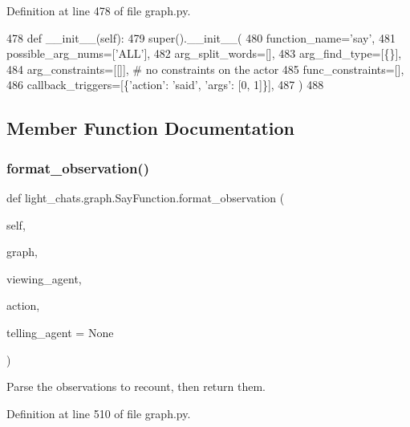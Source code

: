 Definition at line 478 of file graph.\+py.


\begin{DoxyCode}
478     \textcolor{keyword}{def }\_\_init\_\_(self):
479         super().\_\_init\_\_(
480             function\_name=\textcolor{stringliteral}{'say'},
481             possible\_arg\_nums=[\textcolor{stringliteral}{'ALL'}],
482             arg\_split\_words=[],
483             arg\_find\_type=[\{\}],
484             arg\_constraints=[[]],  \textcolor{comment}{# no constraints on the actor}
485             func\_constraints=[],
486             callback\_triggers=[\{\textcolor{stringliteral}{'action'}: \textcolor{stringliteral}{'said'}, \textcolor{stringliteral}{'args'}: [0, 1]\}],
487         )
488 
\end{DoxyCode}


\subsection{Member Function Documentation}
\mbox{\label{classlight__chats_1_1graph_1_1SayFunction_a20e5908183144f719a93276707938894}} 
\subsubsection{\texorpdfstring{format\+\_\+observation()}{format\_observation()}}
{\footnotesize\ttfamily def light\+\_\+chats.\+graph.\+Say\+Function.\+format\+\_\+observation (\begin{DoxyParamCaption}\item[{}]{self,  }\item[{}]{graph,  }\item[{}]{viewing\+\_\+agent,  }\item[{}]{action,  }\item[{}]{telling\+\_\+agent = {\ttfamily None} }\end{DoxyParamCaption})}

\begin{DoxyVerb}Parse the observations to recount, then return them.
\end{DoxyVerb}
 

Definition at line 510 of file graph.\+py.


